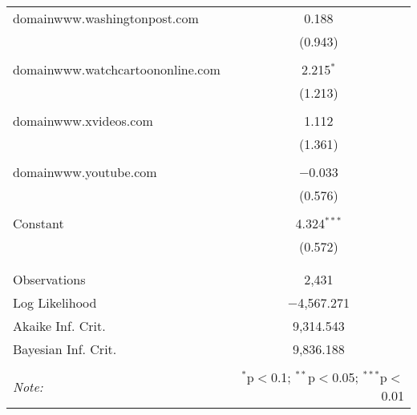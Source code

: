 \begin{table}[!htbp]
\begin{tabular}{@{\extracolsep{5pt}}lc}
 domainwww.washingtonpost.com & 0.188 \\ 
  & (0.943) \\ 
  & \\ 
 domainwww.watchcartoononline.com & 2.215$^{*}$ \\ 
  & (1.213) \\ 
  & \\ 
 domainwww.xvideos.com & 1.112 \\ 
  & (1.361) \\ 
  & \\ 
 domainwww.youtube.com & $-$0.033 \\ 
  & (0.576) \\ 
  & \\ 
 Constant & 4.324$^{***}$ \\ 
  & (0.572) \\ 
  & \\ 
\hline \\[-1.8ex] 
Observations & 2,431 \\ 
Log Likelihood & $-$4,567.271 \\ 
Akaike Inf. Crit. & 9,314.543 \\ 
Bayesian Inf. Crit. & 9,836.188 \\ 
\hline 
\hline \\[-1.8ex] 
\textit{Note:}  & \multicolumn{1}{r}{$^{*}$p$<$0.1; $^{**}$p$<$0.05; $^{***}$p$<$0.01} \\ 
\end{tabular} 
\end{table} 